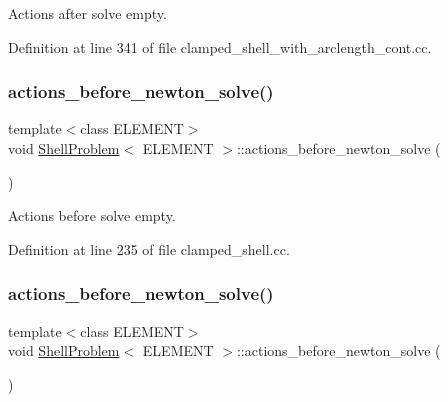 Actions after solve empty. 



Definition at line 341 of file clamped\+\_\+shell\+\_\+with\+\_\+arclength\+\_\+cont.\+cc.

\mbox{\label{classShellProblem_a379156a43ce05fe0e2dcf8a986a2ac64}} 
\subsubsection{\texorpdfstring{actions\+\_\+before\+\_\+newton\+\_\+solve()}{actions\_before\_newton\_solve()}\hspace{0.1cm}{\footnotesize\ttfamily [1/2]}}
{\footnotesize\ttfamily template$<$class E\+L\+E\+M\+E\+NT$>$ \\
void \hyperlink{classShellProblem}{Shell\+Problem}$<$ E\+L\+E\+M\+E\+NT $>$\+::actions\+\_\+before\+\_\+newton\+\_\+solve (\begin{DoxyParamCaption}{ }\end{DoxyParamCaption})\hspace{0.3cm}{\ttfamily [inline]}}



Actions before solve empty. 



Definition at line 235 of file clamped\+\_\+shell.\+cc.

\mbox{\label{classShellProblem_a379156a43ce05fe0e2dcf8a986a2ac64}} 
\subsubsection{\texorpdfstring{actions\+\_\+before\+\_\+newton\+\_\+solve()}{actions\_before\_newton\_solve()}\hspace{0.1cm}{\footnotesize\ttfamily [2/2]}}
{\footnotesize\ttfamily template$<$class E\+L\+E\+M\+E\+NT$>$ \\
void \hyperlink{classShellProblem}{Shell\+Problem}$<$ E\+L\+E\+M\+E\+NT $>$\+::actions\+\_\+before\+\_\+newton\+\_\+solve (\begin{DoxyParamCaption}{ }\end{DoxyParamCaption})\hspace{0.3cm}{\ttfamily [inline]}}



